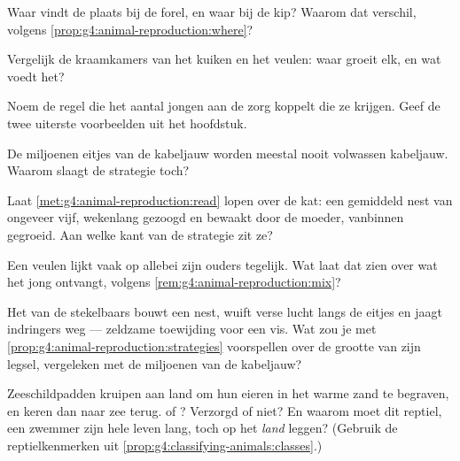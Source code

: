 \begin{exercise}[$\star$]\label{exo:g4:animal-reproduction:4}
Waar vindt de  plaats bij de forel, en waar bij de kip?
Waarom dat verschil, volgens \cref{prop:g4:animal-reproduction:where}?
\end{exercise}

\begin{exercise}[$\star$]\label{exo:g4:animal-reproduction:5}
Vergelijk de kraamkamers van het kuiken en het veulen: waar groeit elk,
en wat voedt het?
\end{exercise}

\begin{exercise}[$\star$]\label{exo:g4:animal-reproduction:6}
Noem de regel die het aantal jongen aan de zorg koppelt die ze krijgen.
Geef de twee uiterste voorbeelden uit het hoofdstuk.
\end{exercise}

\begin{exercise}[$\star$]\label{exo:g4:animal-reproduction:7}
De miljoenen eitjes van de kabeljauw worden meestal nooit volwassen
kabeljauw. Waarom slaagt de strategie toch?
\end{exercise}

\begin{exercise}[$\star$]\label{exo:g4:animal-reproduction:8}
Laat \cref{met:g4:animal-reproduction:read} lopen over de kat: een
gemiddeld nest van ongeveer vijf, wekenlang gezoogd en bewaakt door de
moeder, vanbinnen gegroeid. Aan welke kant van de strategie zit ze?
\end{exercise}

\begin{exercise}[$\star\star$]\label{exo:g4:animal-reproduction:9}
Een veulen lijkt vaak op allebei zijn ouders tegelijk. Wat laat dat
zien over wat het jong ontvangt, volgens
\cref{rem:g4:animal-reproduction:mix}?
\end{exercise}

\begin{exercise}[$\star\star$]\label{exo:g4:animal-reproduction:10}
Het  van de stekelbaars bouwt een nest, wuift verse lucht langs
de eitjes en jaagt indringers weg --- zeldzame toewijding voor een vis.
Wat zou je met \cref{prop:g4:animal-reproduction:strategies} voorspellen
over de grootte van zijn legsel, vergeleken met de miljoenen van de
kabeljauw?
\end{exercise}

\begin{exercise}[$\star\star\star$]\label{exo:g4:animal-reproduction:11}
Zeeschildpadden kruipen aan land om hun eieren in het warme zand te
begraven, en keren dan naar zee terug.  of ?
Verzorgd of niet? En waarom moet dit reptiel, een zwemmer zijn hele
leven lang, toch op het \emph{land} leggen? (Gebruik de
reptielkenmerken uit \cref{prop:g4:classifying-animals:classes}.)
\end{exercise}
